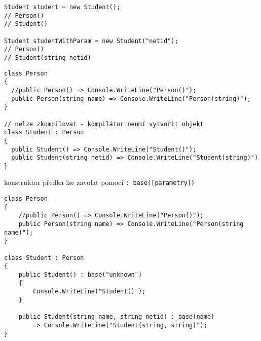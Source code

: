\begin{frame}[fragile]
\begin{yesblock}
\begin{lstlisting}[basicstyle=\small]
Student student = new Student();
// Person()
// Student()

Student studentWithParam = new Student("netid");
// Person()
// Student(string netid)
\end{lstlisting}
\end{yesblock}
\end{frame}


\begin{frame}[fragile]
\begin{noblock}
\begin{lstlisting}[basicstyle=\small]
class Person
{
  //public Person() => Console.WriteLine("Person()");
  public Person(string name) => Console.WriteLine("Person(string)");
}

// nelze zkompilovat - kompilátor neumí vytvořit objekt
class Student : Person
{
  public Student() => Console.WriteLine("Student()");
  public Student(string netid) => Console.WriteLine("Student(string)")
}
\end{lstlisting}
\end{noblock}
\end{frame}



\begin{frame}[fragile]
\begin{bitemize}{}
\item konstruktor předka lze zavolat pomocí \lstinline|: base([parametry])|
\end{bitemize}

\begin{yesblock}
\begin{lstlisting}[basicstyle=\small]
class Person
{
    //public Person() => Console.WriteLine("Person()");
    public Person(string name) => Console.WriteLine("Person(string name)");
}

class Student : Person
{
    public Student() : base("unknown") 
    {
        Console.WriteLine("Student()");
    }

    public Student(string name, string netid) : base(name) 
        => Console.WriteLine("Student(string, string)");
}
\end{lstlisting}
\end{yesblock}
\end{frame}




